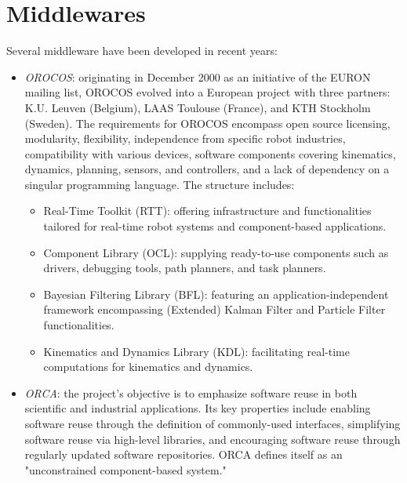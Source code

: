 \section{Middlewares}

Several middleware have been developed in recent years:
\begin{itemize}
    \item \textit{OROCOS}: originating in December 2000 as an initiative of the EURON mailing list, OROCOS evolved into a European project with three partners: K.U. Leuven (Belgium), LAAS Toulouse (France), and KTH Stockholm (Sweden).
        The requirements for OROCOS encompass open source licensing, modularity, flexibility, independence from specific robot industries, compatibility with various devices, software components covering kinematics, dynamics, planning, sensors, and controllers, and a lack of dependency on a singular programming language.
        The structure includes:
        \begin{itemize}
            \item Real-Time Toolkit (RTT): offering infrastructure and functionalities tailored for real-time robot systems and component-based applications.
            \item Component Library (OCL): supplying ready-to-use components such as drivers, debugging tools, path planners, and task planners.
            \item Bayesian Filtering Library (BFL): featuring an application-independent framework encompassing (Extended) Kalman Filter and Particle Filter functionalities.
            \item Kinematics and Dynamics Library (KDL): facilitating real-time computations for kinematics and dynamics.
        \end{itemize}
    \item \textit{ORCA}: the project's objective is to emphasize software reuse in both scientific and industrial applications. 
        Its key properties include enabling software reuse through the definition of commonly-used interfaces, simplifying software reuse via high-level libraries, and encouraging software reuse through regularly updated software repositories. 
        ORCA defines itself as an "unconstrained component-based system."
        

\end{itemize}
